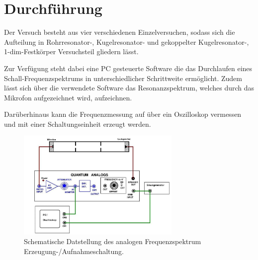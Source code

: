 \newpage
\section{Durchführung}
Der Versuch besteht aus vier verschiedenen Einzelversuchen, sodass sich die Aufteilung
in Rohrresonator-, Kugelresonator- und gekoppelter Kugelresonator-, 1-dim-Festkörper Versuchsteil gliedern lässt.

Zur Verfügung steht dabei eine PC gesteuerte Software die das Durchlaufen eines Schall-Frequenzspektrums 
in unterschiedlicher Schrittweite ermöglicht. Zudem lässt sich über die verwendete Software das Resonanzspektrum, welches durch 
das Mikrofon aufgezeichnet wird, aufzeichnen.

Darüberhinaus kann die Frequenzmessung auf über ein Oszilloskop vermessen und mit einer Schaltungseinheit
erzeugt werden.
\begin{figure}
    \center
    \includegraphics[width=0.7\textwidth]{bilder/anleitung.jpg}
    \caption{Schematische Datstellung des analogen Frequenzspektrum Erzeugung-/Aufnahmeschaltung.\cite{anleitung}}
\end{figure}

